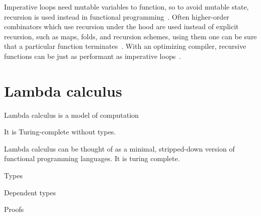 Imperative loops need mutable variables to function, so to avoid mutable state,
recursion is used instead in functional programming~\cite{functional-Hudak}.
Often higher-order combinators which use recursion under the hood are used
instead of explicit recursion, such as maps, folds, and recursion schemes, using
them one can be sure that a particular function terminates~\cite{fold-Hutton,
  bananas-Meijer}. With an optimizing compiler, recursive functions can be just as
performant as imperative loops~\cite{sicp}.

\section{Lambda calculus}

Lambda calculus is a model of computation

It is Turing-complete without types.

Lambda calculus can be thought of as a minimal, stripped-down version of
functional programming languages. It is turing complete.

Types

Dependent types

Proofs
